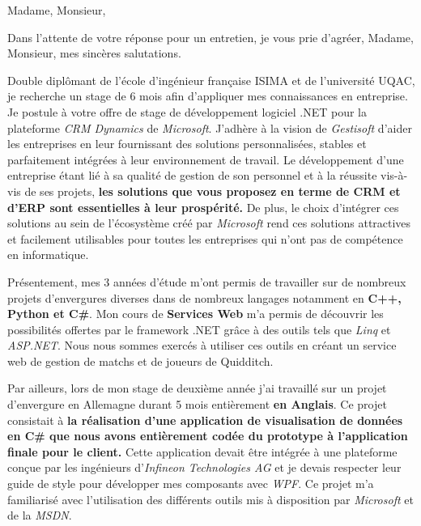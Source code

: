 \date{\today}
\opening{Madame, Monsieur,}
\closing{Dans l'attente de votre réponse pour un entretien, je vous prie d'agréer, Madame, Monsieur, mes sincères salutations.}

\makelettertitle

Double diplômant de l'école d'ingénieur française ISIMA et de l'université UQAC, je recherche un stage de 6 mois afin d’appliquer mes connaissances en entreprise. Je postule à votre offre de stage de développement logiciel .NET pour la plateforme \textit{CRM Dynamics} de \textit{Microsoft}. J'adhère à la vision de \textit{Gestisoft} d'aider les entreprises en leur fournissant des solutions personnalisées, stables et parfaitement intégrées à leur environnement de travail. Le développement d'une entreprise étant lié à sa qualité de gestion de son personnel et à la réussite vis-à-vis de ses projets, \textbf{les solutions que vous proposez en terme de CRM et d'ERP sont essentielles à leur prospérité.} De plus, le choix d'intégrer ces solutions au sein de l'écosystème créé par \textit{Microsoft} rend ces solutions attractives et facilement utilisables pour toutes les entreprises qui n'ont pas de compétence en informatique.

Présentement, mes 3 années d'étude m'ont permis de travailler sur de nombreux projets d'envergures diverses dans de nombreux langages notamment en \textbf{C++, Python et C\#}. Mon cours de \textbf{Services Web} m'a permis de découvrir les possibilités offertes par le framework .NET grâce à des outils tels que \textit{Linq} et \textit{ASP.NET}. Nous nous sommes exercés à utiliser ces outils en créant un service web de gestion de matchs et de joueurs de Quidditch.

Par ailleurs, lors de mon stage de deuxième année j'ai travaillé sur un projet d'envergure en Allemagne durant 5 mois entièrement \textbf{en Anglais}. Ce projet consistait à \textbf{la réalisation d'une application de visualisation de données en C\# que nous avons entièrement codée du prototype à l'application finale pour le client.} Cette application devait être intégrée à une plateforme conçue par les ingénieurs d'\textit{Infineon Technologies AG} et je devais respecter leur guide de style pour développer mes composants avec \textit{WPF}. Ce projet m'a familiarisé avec l'utilisation des différents outils mis à disposition par \textit{Microsoft} et de la \textit{MSDN}.

